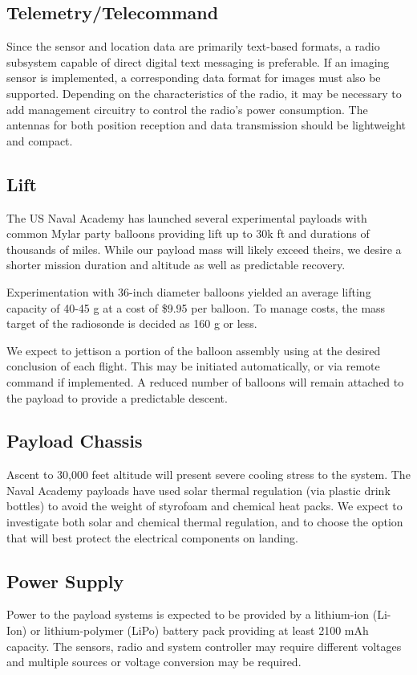 \documentclass[conference,compsoc]{IEEEtran}
\begin{document}
\subsection{Telemetry/Telecommand}
Since the sensor and location data are primarily text-based formats, a radio subsystem capable of direct digital text messaging is preferable.  If an imaging sensor is implemented, a corresponding data format for images must also be supported. Depending on the characteristics of the radio, it may be necessary to add management circuitry to control the radio’s power consumption.  The antennas for both position reception and data transmission should be lightweight and compact.

\subsection{Lift}
The US Naval Academy has launched several experimental payloads with common Mylar party balloons providing lift up to 30k ft and durations of thousands of miles.  While our payload mass will likely exceed theirs, we desire a shorter mission duration and altitude as well as predictable recovery.  

Experimentation with 36-inch diameter balloons yielded an average lifting capacity of 40-45 g at a cost of \$9.95 per balloon.  To manage costs, the mass target of the radiosonde is decided as 160 g or less.

We expect to jettison a portion of the balloon assembly using at the desired conclusion of each flight.  This may be initiated automatically, or via remote command if implemented.  A reduced number of balloons will remain attached to the payload to provide a predictable descent.

\subsection{Payload Chassis}
Ascent to 30,000 feet altitude will present severe cooling stress to the system.  The Naval Academy payloads have used solar thermal regulation (via plastic drink bottles) to avoid the weight of styrofoam and chemical heat packs.  We expect to investigate both solar and chemical thermal regulation, and to choose the option that will best protect the electrical components on landing.

\subsection{Power Supply}
Power to the payload systems is expected to be provided by a lithium-ion (Li-Ion) or lithium-polymer (LiPo) battery pack providing at least 2100 mAh capacity.  The sensors, radio and system controller may require different voltages and multiple sources or voltage conversion may be required.
\end{document}
